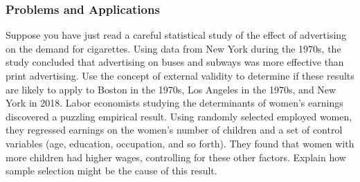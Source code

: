 

\begin{frame}
\frametitle{Problems and Applications}
Suppose you have just read a careful statistical study of the effect of advertising on the demand for cigarettes. Using data from New York during the 1970s, the study concluded that advertising on buses and subways was more effective than print advertising. Use the concept of external validity to determine if these results are likely to apply to Boston in the 1970s, Los Angeles in the 1970s, and New York in 2018.
Labor economists studying the determinants of women's earnings discovered a puzzling empirical result. Using randomly selected employed women, they regressed earnings on the women's number of children and a set of control variables (age, education, occupation, and so forth). They found that women with more children had higher wages, controlling for these other factors. Explain how sample selection might be the cause of this result. 
\end{frame}

